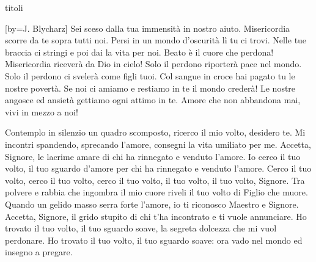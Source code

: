 \begin{songs}{titoli}

[by={J. Blycharz}]
\beginverse
Sei sceso dalla tua immensità
in nostro aiuto.
Misericordia scorre da te
sopra tutti noi.
Persi in un mondo d'oscurità
lì tu ci trovi.
Nelle tue braccia ci stringi e poi
dai la vita per noi.
\endverse
\beginchorus
Beato è il cuore che perdona!
Misericordia riceverà da Dio in cielo!
\endchorus
\beginverse
Solo il perdono riporterà
pace nel mondo.
Solo il perdono ci svelerà
come figli tuoi.
\endverse
\beginverse
Col sangue in croce hai pagato tu
le nostre povertà.
Se noi ci amiamo e restiamo in te
il mondo crederà!
\endverse
\beginverse*
Le nostre angosce ed ansietà
gettiamo ogni attimo in te.
Amore che non abbandona mai,
vivi in mezzo a noi!
\endverse
\endsong

\beginverse
Contemplo in silenzio
un quadro scomposto,
ricerco il mio volto,
desidero te.
Mi incontri spandendo,
sprecando l'amore,
consegni la vita
umiliato per me.
Accetta, Signore, le lacrime amare
di chi ha rinnegato e venduto l'amore.
\endverse
\beginchorus
Io cerco il tuo volto,
il tuo sguardo d'amore
per chi ha rinnegato
e venduto l'amore.
Cerco il tuo volto, cerco il tuo volto,
cerco il tuo volto,
il tuo volto, il tuo volto, Signore.
\endchorus
\beginverse
Tra polvere e rabbia
che ingombra il mio cuore
riveli il tuo volto
di Figlio che muore.
Quando un gelido masso
serra forte l'amore,
io ti riconosco
Maestro e Signore.
Accetta, Signore, il grido stupito
di chi t'ha incontrato e ti vuole annunciare.
\endverse
\beginverse
Ho trovato il tuo volto,
il tuo sguardo soave,
la segreta dolcezza
che mi vuol perdonare.
Ho trovato il tuo volto,
il tuo sguardo soave:
ora vado nel mondo
ed insegno a pregare.
\endverse
\endsong


\end{songs}

